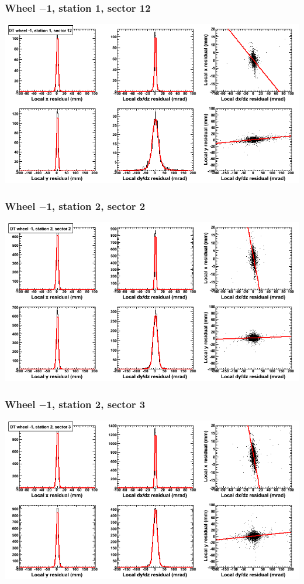 \documentclass[compress]{beamer}
\begin{document}
\begin{frame}
\frametitle{Wheel $-$1, station 1, sector 12}
\includegraphics[width=\linewidth]{tmpbell_MBwhBst1sec12.png}
\end{frame}

\begin{frame}
\frametitle{Wheel $-$1, station 2, sector 2}
\includegraphics[width=\linewidth]{tmpbell_MBwhBst2sec02.png}
\end{frame}

\begin{frame}
\frametitle{Wheel $-$1, station 2, sector 3}
\includegraphics[width=\linewidth]{tmpbell_MBwhBst2sec03.png}
\end{frame}
\end{document}
